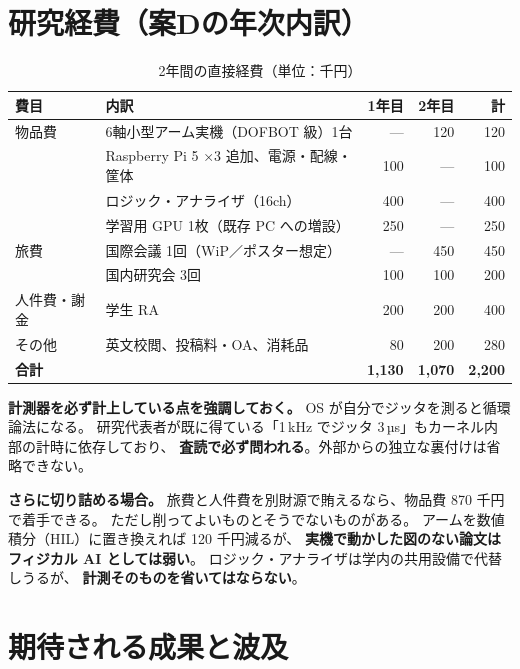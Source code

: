 \documentclass[11pt,a4paper]{article}
\newcommand{\prob}[1]{\textbf{\textcolor{red!55!black}{#1}}}
\newcommand{\keyp}[1]{\textbf{\textcolor{blue!45!black}{#1}}}
\begin{document}
\section{研究経費（案Dの年次内訳）}
\label{sec:budgetD}

\begin{table}[htbp]
\centering
\small
\caption{2年間の直接経費（単位：千円）}
\begin{tabularx}{\textwidth}{@{}l X r r r@{}}
\toprule
\textbf{費目} & \textbf{内訳} & \textbf{1年目} & \textbf{2年目} & \textbf{計} \\
\midrule
物品費 & 6軸小型アーム実機（DOFBOT 級）1台 & --- & 120 & 120 \\
       & Raspberry Pi 5 ×3 追加、電源・配線・筐体 & 100 & --- & 100 \\
       & ロジック・アナライザ（16ch） & 400 & --- & 400 \\
       & 学習用 GPU 1枚（既存 PC への増設） & 250 & --- & 250 \\
\midrule
旅費 & 国際会議 1回（WiP／ポスター想定） & --- & 450 & 450 \\
     & 国内研究会 3回 & 100 & 100 & 200 \\
\midrule
人件費・謝金 & 学生 RA & 200 & 200 & 400 \\
\midrule
その他 & 英文校閲、投稿料・OA、消耗品 & 80 & 200 & 280 \\
\midrule
\textbf{合計} & & \textbf{1,130} & \textbf{1,070} & \textbf{2,200} \\
\bottomrule
\end{tabularx}
\end{table}

\noindent
\keyp{計測器を必ず計上している点を強調しておく。}
OS が自分でジッタを測ると循環論法になる。
研究代表者が既に得ている「1\,kHz でジッタ 3\,µs」もカーネル内部の計時に依存しており、
\prob{査読で必ず問われる}。外部からの独立な裏付けは省略できない。

\medskip
\noindent
\textbf{さらに切り詰める場合。}
旅費と人件費を別財源で賄えるなら、物品費 870 千円で着手できる。
ただし削ってよいものとそうでないものがある。
アームを数値積分（HIL）に置き換えれば 120 千円減るが、
\prob{実機で動かした図のない論文はフィジカル AI としては弱い}。
ロジック・アナライザは学内の共用設備で代替しうるが、
\prob{計測そのものを省いてはならない}。

\section{期待される成果と波及}
\end{document}
